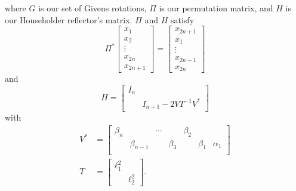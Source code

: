 %
where $G$ is our set of Givens rotations, $\Pi$ is our permutation matrix,
and $H$ is our Householder reflector's matrix.
$\Pi$ and $H$ satisfy
%
\begin{equation}
    \Pi^{*} \begin{bmatrix} x_{1} \\ x_{2} \\ \vdots \\ x_{2n} \\ x_{2n+1}
        \end{bmatrix}
    = \begin{bmatrix} x_{2n+1} \\ x_{1} \\ \vdots \\ x_{2n-1} \\ x_{2n}
        \end{bmatrix}
\end{equation}
%
and
%
\begin{equation}
    H = \begin{bmatrix} I_{n} & \\ & I_{n+1} - 2VT^{-1}V^{*} \end{bmatrix}
\end{equation}
%
with
%
\begin{align}
    V^{*} &= \begin{bmatrix}
        \beta_{n} & & \cdots & & \beta_{2} & & \\
        & \beta_{n-1} & & \beta_{3} & & \beta_{1} & \alpha_{1} \\
    \end{bmatrix} \nonumber\\
    T &= \begin{bmatrix} \ell_{1}^{2} & \\ & \ell_{2}^{2} \end{bmatrix}.
\end{align}

